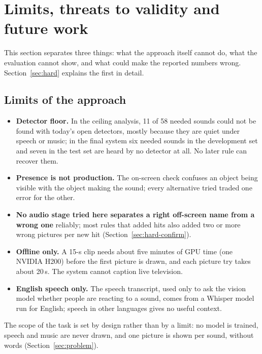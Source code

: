 \section{Limits, threats to validity and future work}\label{sec:limits}\label{sec:disclosures}

This section separates three things: what the approach itself cannot do, what the evaluation cannot show, and what
could make the reported numbers wrong. Section~\ref{sec:hard} explains the first in detail.

\subsection{Limits of the approach}
\begin{itemize}
  \item \textbf{Detector floor.} In the ceiling analysis, 11 of 58 needed sounds could
        not be found with today's open detectors, mostly because they are quiet under speech or music; in the final system
        six needed sounds in the development set and seven in the test set are heard by no detector at all. No later rule can recover them.
  \item \textbf{Presence is not production.} The on-screen check confuses an object being visible with the object
        making the sound; every alternative tried traded one error for the other.
  \item \textbf{No audio stage tried here separates a right off-screen name from a wrong one} reliably; most rules that added hits also added two or more wrong
        pictures per new hit (Section~\ref{sec:hard-confirm}).
  \item \textbf{Offline only.} A 15-s clip needs about five minutes of GPU time (one NVIDIA H200) before the first picture
        is drawn, and each picture try takes about 20\,s. The system cannot caption live television.
  \item \textbf{English speech only.} The speech transcript, used only to ask the vision model whether people are reacting to a sound,
        comes from a
        Whisper model~\cite{radford2023whisper} run for English; speech in other languages gives no useful context.
\end{itemize}
The scope of the task is set by design rather than by a limit: no model is trained, speech and music are never drawn,
and one picture is shown per sound, without words (Section~\ref{sec:problem}).

